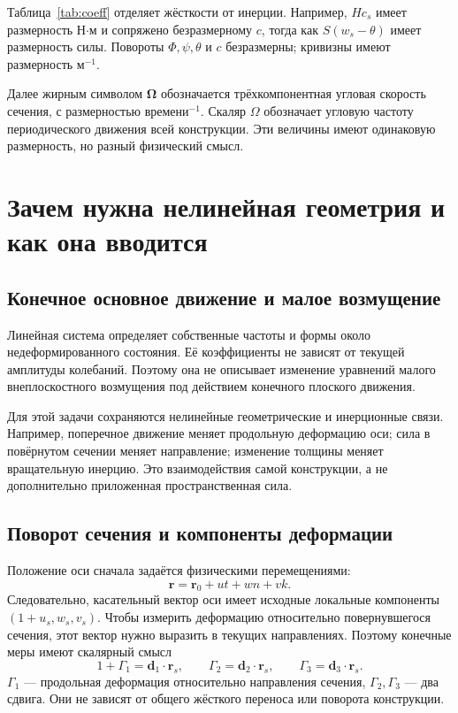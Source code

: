 \documentclass[11pt,a4paper]{article}
\begin{document}
Таблица~\ref{tab:coeff} отделяет жёсткости от инерции. Например, $Hc_s$ имеет размерность Н$\cdot$м и сопряжено безразмерному $c$, тогда как $S(w_s-\theta)$ имеет размерность силы. Повороты $\Phi,\psi,\theta$ и $c$ безразмерны; кривизны имеют размерность м$^{-1}$.

Далее жирным символом $\boldsymbol\Omega$ обозначается трёхкомпонентная угловая скорость сечения, с размерностью времени$^{-1}$. Скаляр $\Omega$ обозначает угловую частоту периодического движения всей конструкции. Эти величины имеют одинаковую размерность, но разный физический смысл.

\section{Зачем нужна нелинейная геометрия и как она вводится}
\subsection{Конечное основное движение и малое возмущение}
Линейная система определяет собственные частоты и формы около недеформированного состояния. Её коэффициенты не зависят от текущей амплитуды колебаний. Поэтому она не описывает изменение уравнений малого внеплоскостного возмущения под действием конечного плоского движения.

Для этой задачи сохраняются нелинейные геометрические и инерционные связи. Например, поперечное движение меняет продольную деформацию оси; сила в повёрнутом сечении меняет направление; изменение толщины меняет вращательную инерцию. Это взаимодействия самой конструкции, а не дополнительно приложенная пространственная сила.

\subsection{Поворот сечения и компоненты деформации}
Положение оси сначала задаётся физическими перемещениями:
\[
\mathbf r=\mathbf r_0+u t+w n+v k.
\]
Следовательно, касательный вектор оси имеет исходные локальные компоненты $(1+u_s,w_s,v_s)$. Чтобы измерить деформацию относительно повернувшегося сечения, этот вектор нужно выразить в текущих направлениях. Поэтому конечные меры имеют скалярный смысл
\[
1+\Gamma_1=\mathbf d_1\cdot\mathbf r_s,\qquad
\Gamma_2=\mathbf d_2\cdot\mathbf r_s,\qquad
\Gamma_3=\mathbf d_3\cdot\mathbf r_s.
\]
$\Gamma_1$ --- продольная деформация относительно направления сечения, $\Gamma_2,\Gamma_3$ --- два сдвига. Они не зависят от общего жёсткого переноса или поворота конструкции.
\end{document}
